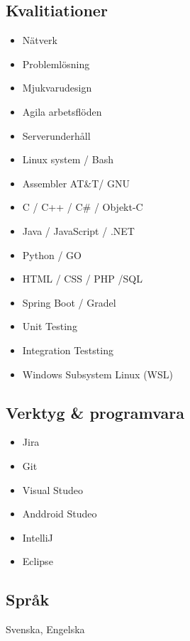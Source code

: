 \documentclass{article}
\begin{document}
\begin{minipage}[t]{0.28\textwidth}
\subsection*{\textcolor{colorBlue}{Kvalitiationer}}
\begin{itemize}
  \item Nätverk
  \item Problemlösning
  \item Mjukvarudesign
  \item Agila arbetsflöden
  \item Serverunderhåll
  \item Linux system / Bash
  \item Assembler AT\&T/ GNU
  \item C / C++ / C\# / Objekt-C
  \item Java / JavaScript / .NET
  \item Python / GO
  \item HTML / CSS / PHP /SQL
  \item Spring Boot / Gradel
  \item Unit Testing
  \item Integration Teststing
  \item Windows Subsystem Linux (WSL)
\end{itemize}
\vspace{-10pt} %
\subsection*{\textcolor{colorBlue}{Verktyg \& programvara}}
\begin{itemize}
  \item Jira
  \item Git
  \item Visual Studeo
  \item Anddroid Studeo
  \item IntelliJ
  \item Eclipse
\end{itemize}
\vspace{-10pt} %
\subsection*{\textcolor{colorBlue}{Språk}}
Svenska, Engelska
\end{minipage}
\end{document}
